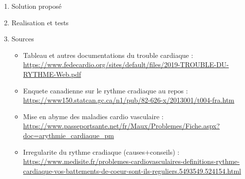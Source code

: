 \begin{enumerate}
	\item{Solution proposé}

	\item{Realisation et tests}

	\item{Sources}
\begin{itemize}
\item Tableau et autres documentations du trouble cardiaque : \url{https://www.fedecardio.org/sites/default/files/2019-TROUBLE-DU-RYTHME-Web.pdf}
\item Enquete canadienne sur le rythme cradiaque au repos : \url{https://www150.statcan.gc.ca/n1/pub/82-626-x/2013001/t004-fra.htm}
\item Mise en abyme des maladies cardio vasculaire : \url{https://www.passeportsante.net/fr/Maux/Problemes/Fiche.aspx?doc=arythmie_cardiaque_pm}
\item Irregularite du rythme cradiaque (causes+conseils) : \url{https://www.medisite.fr/problemes-cardiovasculaires-definitions-rythme-cardiaque-vos-battements-de-coeur-sont-ils-reguliers.5493549.524154.html}
\end{itemize}

\end{enumerate}
